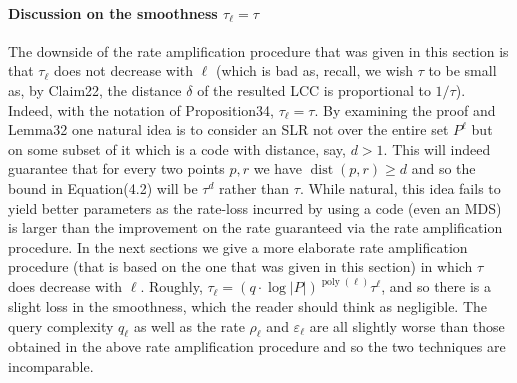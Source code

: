 \paragraph{Discussion on the smoothness $\tau_\ell=\tau$}
The downside of the rate amplification procedure that was given in this section is that $\tau_\ell$ does not decrease with $\ell$ (which is bad as, recall, we wish $\tau$ to be small as, by Claim22, the distance $\delta$ of the resulted LCC is proportional to $1/\tau$). Indeed, with the notation of Proposition34, $\tau_\ell=\tau$. By examining the proof and Lemma32 one natural idea is to consider an SLR not over the entire set $P^\ell$ but on some subset of it which is a code with distance, say, $d>1$. This will indeed guarantee that for every two points $p,r$ we have $\operatorname{dist}(p,r)\geq d$ and so the bound in Equation(4.2) will be $\tau^d$ rather than $\tau$. While natural, this idea fails to yield better parameters as the rate-loss incurred by using a code (even an MDS) is larger than the improvement on the rate guaranteed via the rate amplification procedure.
In the next sections we give a more elaborate rate amplification procedure (that is based on the one that was given in this section) in which $\tau$ does decrease with $\ell$. Roughly, $\tau_\ell=(q\cdot\log|P|)^{\operatorname{poly}(\ell)}\tau^\ell$, and so there is a slight loss in the smoothness, which the reader should think as negligible. The query complexity $q_\ell$ as well as the rate $\rho_\ell$ and $\varepsilon_\ell$ are all slightly worse than those obtained in the above rate amplification procedure and so the two techniques are incomparable.

